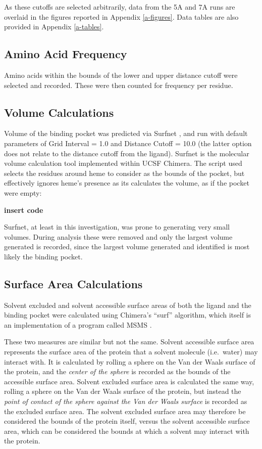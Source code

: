 \documentclass[a4paper, nobind]{templates/ociamthesis}
\begin{document}
As these cutoffs are selected arbitrarily, data from the 5A and 7A runs are overlaid in the figures reported in Appendix \ref{a-figures}. Data tables are also provided in Appendix \ref{a-tables}.

\hypertarget{amino-acid-frequency}{%
\subsection{Amino Acid Frequency}\label{amino-acid-frequency}}

Amino acids within the bounds of the lower and upper distance cutoff were selected and recorded. These were then counted for frequency per residue.

\hypertarget{volume-calculations}{%
\subsection{Volume Calculations}\label{volume-calculations}}

Volume of the binding pocket was predicted via Surfnet \autocite{Laskowski1995}, and run with default parameters of Grid Interval = 1.0 and Distance Cutoff = 10.0 (the latter option does not relate to the distance cutoff from the ligand). Surfnet is the molecular volume calculation tool implemented within UCSF Chimera. The script used selects the residues around heme to consider as the bounds of the pocket, but effectively ignores heme's presence as its calculates the volume, as if the pocket were empty:

\textbf{insert code}

Surfnet, at least in this investigation, was prone to generating very small volumes. During analysis these were removed and only the largest volume generated is recorded, since the largest volume generated and identified is most likely the binding pocket.

\hypertarget{SAmethods}{%
\subsection{Surface Area Calculations}\label{SAmethods}}

Solvent excluded and solvent accessible surface areas of both the ligand and the binding pocket were calculated using Chimera's ``surf'' algorithm, which itself is an implementation of a program called MSMS \autocite{Sanner1996}.

These two measures are similar but not the same. Solvent accessible surface area represents the surface area of the protein that a solvent molecule (i.e.~water) may interact with. It is calculated by rolling a sphere on the Van der Waals surface of the protein, and the \emph{center of the sphere} is recorded as the bounds of the accessible surface area. Solvent excluded surface area is calculated the same way, rolling a sphere on the Van der Waals surface of the protein, but instead the \emph{point of contact of the sphere against the Van der Waals surface} is recorded as the excluded surface area. The solvent excluded surface area may therefore be considered the bounds of the protein itself, versus the solvent accessible surface area, which can be considered the bounds at which a solvent may interact with the protein\autocite{Sanner1996}.
\end{document}
